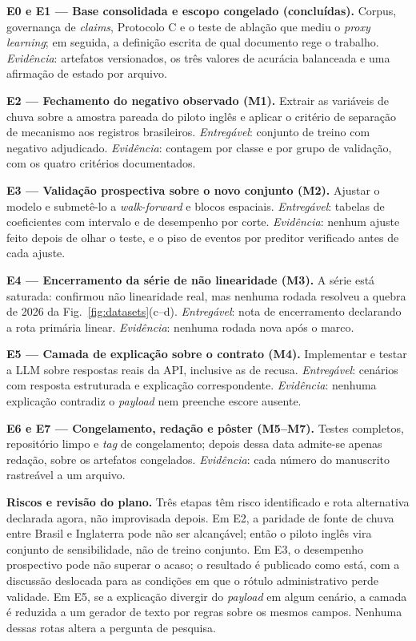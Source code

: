 \documentclass[conference]{IEEEtran}
\begin{document}
\textbf{E0 e E1 --- Base consolidada e escopo congelado (concluídas).} Corpus,
governança de \emph{claims}, Protocolo C e o teste de ablação que mediu o
\emph{proxy learning}; em seguida, a definição escrita de qual documento rege o
trabalho. \emph{Evidência}: artefatos versionados, os três valores de acurácia
balanceada e uma afirmação de estado por arquivo.

\textbf{E2 --- Fechamento do negativo observado (M1).} Extrair as variáveis de
chuva sobre a amostra pareada do piloto inglês e aplicar o critério de separação
de mecanismo aos registros brasileiros. \emph{Entregável}: conjunto de treino com
negativo adjudicado. \emph{Evidência}: contagem por classe e por grupo de
validação, com os quatro critérios documentados.

\textbf{E3 --- Validação prospectiva sobre o novo conjunto (M2).} Ajustar o
modelo e submetê-lo a \emph{walk-forward} e blocos espaciais. \emph{Entregável}:
tabelas de coeficientes com intervalo e de desempenho por corte.
\emph{Evidência}: nenhum ajuste feito depois de olhar o teste, e o piso de
eventos por preditor verificado antes de cada ajuste.

\textbf{E4 --- Encerramento da série de não linearidade (M3).} A série está
saturada: confirmou não linearidade real, mas nenhuma rodada resolveu a quebra de
2026 da Fig.~\ref{fig:datasets}(c--d). \emph{Entregável}: nota de encerramento
declarando a rota primária linear. \emph{Evidência}: nenhuma rodada nova após o
marco.

\textbf{E5 --- Camada de explicação sobre o contrato (M4).} Implementar e testar
a LLM sobre respostas reais da API, inclusive as de recusa. \emph{Entregável}:
cenários com resposta estruturada e explicação correspondente. \emph{Evidência}:
nenhuma explicação contradiz o \emph{payload} nem preenche escore ausente.

\textbf{E6 e E7 --- Congelamento, redação e pôster (M5--M7).} Testes completos,
repositório limpo e \emph{tag} de congelamento; depois dessa data admite-se
apenas redação, sobre os artefatos congelados. \emph{Evidência}: cada número do
manuscrito rastreável a um arquivo.

\textbf{Riscos e revisão do plano.} Três etapas têm risco identificado e rota
alternativa declarada agora, não improvisada depois. Em E2, a paridade de fonte
de chuva entre Brasil e Inglaterra pode não ser alcançável; então o piloto inglês
vira conjunto de sensibilidade, não de treino conjunto. Em E3, o desempenho prospectivo pode não superar o acaso; o
resultado é publicado como está, com a discussão deslocada para as condições em
que o rótulo administrativo perde validade. Em E5, se a explicação divergir do \emph{payload} em algum cenário, a
camada é reduzida a um gerador de texto por regras sobre os mesmos campos.
Nenhuma dessas rotas altera a pergunta de pesquisa.
\end{document}
